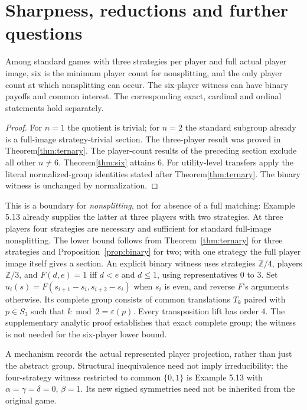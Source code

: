 \section{Sharpness, reductions and further questions}\label{sec:08-boundaries}
\begin{corollary}\label{corollary:08-boundaries-1}
Among standard games with three strategies per player and full actual player
image, six is the minimum player count for nonsplitting, and the only player
count at which nonsplitting can occur. The six-player witness can have binary payoffs
and common interest. The corresponding exact, cardinal and ordinal statements
hold separately.
\end{corollary}
\begin{proof}
For $n=1$ the quotient is trivial; for $n=2$ the standard subgroup already is
a full-image strategy-trivial section. The three-player result was proved
in Theorem\ref{thm:ternary}. The player-count results of the preceding section
exclude all other $n\ne6$. Theorem\ref{thm:six} attains 6. For utility-level
transfers apply the literal normalized-group identities stated after
Theorem\ref{thm:ternary}. The binary witness is unchanged by normalization.
\end{proof}

This is a boundary for \emph{nonsplitting}, not for absence of a full matching:
Example 5.13 already supplies the latter at three players with two strategies.
At three players four strategies are necessary and sufficient for standard
full-image nonsplitting. The lower bound follows from Theorem~\ref{thm:ternary} for three strategies
and Proposition~\ref{prop:binary} for two; with one strategy the full player
image itself gives a section. An explicit binary witness uses strategies $\mathbb Z/4$, players
$\mathbb Z/3$, and $F(d,e)=1$ iff $d<e$ and $d\le1$, using representatives 0 to 3.
Set $u_i(s)=F(s_{i+1}-s_i,s_{i+2}-s_i)$ when $s_i$ is even, and reverse $F$'s
arguments otherwise. Its complete group consists of common translations $T_k$
paired with $p\in S_3$ such that $k\bmod2=\varepsilon(p)$. Every transposition
lift has order 4. The supplementary analytic proof establishes that exact
complete group; the witness is not needed for the six-player lower bound.

A mechanism records the actual represented player projection, rather than
just the abstract group. Structural inequivalence need not imply
irreducibility: the four-strategy witness restricted to common $\{0,1\}$ is
Example 5.13 with $\alpha=\gamma=\delta=0$, $\beta=1$. Its new signed
symmetries need not be inherited from the original game.

